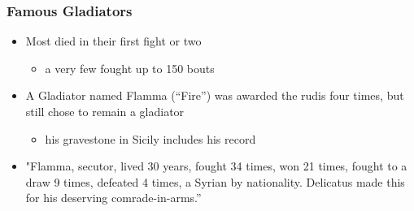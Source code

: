 \documentclass[12pt, twoside]{article}
\begin{document}
\subsubsection{Famous Gladiators}
\begin{itemize}
\item Most died in their first fight or two
	\begin{itemize}
	\item a very few fought up to 150 bouts
	\end{itemize}
\item A Gladiator named Flamma (“Fire”) was awarded the rudis four times, but still chose to remain a gladiator
	\begin{itemize}
	\item his gravestone in Sicily includes his record
	\end{itemize}
\item "Flamma, secutor, lived 30 years, fought 34 times, won 21 times, fought to a draw 9 times, defeated 4 times, a Syrian by nationality. Delicatus made this for his deserving comrade-in-arms.”
\end{itemize}
\end{document}
